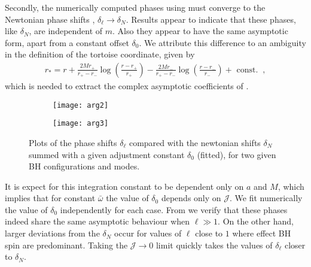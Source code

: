 Secondly, the numerically computed phases using  must converge to the Newtonian phase shifts , $\delta_\ell \to\delta_N$.
Results appear to indicate that these phases, like $\delta_N$, are independent of $m$.
Also they appear to have the same asymptotic form, apart from a constant offset $\delta_0$. 
We attribute this difference to an ambiguity in the definition of the tortoise coordinate, given by
\begin{align}
    r_{*} = r +  \frac{2M r_{+}}{r_{+}-r_{-}} \log\left( \frac{r-r_{+}}{r_{+}}\right) -   \frac{2M r_{-}}{r_{+}-r_{-}} \log\left( \frac{r-r_{-}}{r_{-}} \right) + \text{ const. } ~,
\end{align}
which is needed to extract the complex asymptotic coefficients of .
\begin{figure}[h]
	\centering
	\vspace{0.2cm}
	\begin{subfigure}[c]{0.49\textwidth}
        \texttt{[image: arg2]}
    \end{subfigure}
    \hfill
    \begin{subfigure}[c]{0.48\textwidth}
        \texttt{[image: arg3]}
    \end{subfigure}
    \hfill
	\caption{Plots of the phase shifts $\delta_\ell$ compared with the newtonian shifts $\delta_N$ summed with a given adjustment constant $\delta_0$ (fitted), for two given BH configurations and modes.}
	\label{fig5:argZoutZin}
\end{figure}
It is expect for this integration constant to be dependent only on $a$ and $M$, which implies that for constant $\bar{\omega}$ the value of $\delta_0$ depends only on $\mathscr{J}$.
We fit numerically the value of $\delta_0$ independently for each case.
From  we verify that these phases indeed share the same asymptotic behaviour when $\ell\gg 1$.
On the other hand, larger deviations from the $\delta_N$ occur for values of $\ell$ close to $1$ where effect BH spin are predominant.
Taking the $\mathscr{J} \to 0$ limit quickly takes the values of $\delta_\ell$ closer to $\delta_N$.

